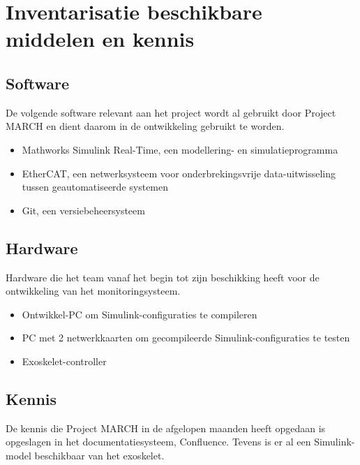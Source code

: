 \section{Inventarisatie beschikbare middelen en kennis}
\subsection{Software}
De volgende software relevant aan het project wordt al gebruikt door Project MARCH en dient daarom in de ontwikkeling gebruikt te worden.
\begin{itemize}
	\item Mathworks Simulink Real-Time, een modellering- en simulatieprogramma
	\item EtherCAT, een netwerksysteem voor onderbrekingsvrije data-uitwisseling tussen geautomatiseerde systemen
	\item Git, een versiebeheersysteem
\end{itemize}

\subsection{Hardware}
Hardware die het team vanaf het begin tot zijn beschikking heeft voor de ontwikkeling van het monitoringsysteem.
\begin{itemize}
	\item Ontwikkel-PC om Simulink-configuraties te compileren
	\item PC met 2 netwerkkaarten om gecompileerde Simulink-configuraties te testen
	\item Exoskelet-controller
\end{itemize}

\subsection{Kennis}
De kennis die Project MARCH in de afgelopen maanden heeft opgedaan is opgeslagen in het documentatiesysteem, Confluence. Tevens is er al een Simulink-model beschikbaar van het exoskelet. 